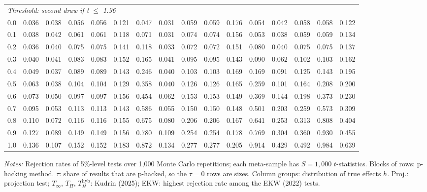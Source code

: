 \begin{table}[htbp]
\begin{tabular}{lccccccccccccccc}
\midrule
\multicolumn{16}{l}{\textit{Threshold: second draw if t $\le$ 1.96}} \\
0.0 & 0.036 & 0.038 & 0.056 & 0.056 & 0.121 & 0.047 & 0.031 & 0.059 & 0.059 & 0.176 & 0.054 & 0.042 & 0.058 & 0.058 & 0.122 \\
0.1 & 0.038 & 0.042 & 0.061 & 0.061 & 0.118 & 0.071 & 0.031 & 0.074 & 0.074 & 0.156 & 0.053 & 0.038 & 0.059 & 0.059 & 0.134 \\
0.2 & 0.036 & 0.040 & 0.075 & 0.075 & 0.141 & 0.118 & 0.033 & 0.072 & 0.072 & 0.151 & 0.080 & 0.040 & 0.075 & 0.075 & 0.137 \\
0.3 & 0.040 & 0.041 & 0.083 & 0.083 & 0.152 & 0.165 & 0.041 & 0.095 & 0.095 & 0.143 & 0.090 & 0.062 & 0.102 & 0.103 & 0.162 \\
0.4 & 0.049 & 0.037 & 0.089 & 0.089 & 0.143 & 0.246 & 0.040 & 0.103 & 0.103 & 0.169 & 0.169 & 0.091 & 0.125 & 0.143 & 0.195 \\
0.5 & 0.063 & 0.038 & 0.104 & 0.104 & 0.129 & 0.358 & 0.040 & 0.126 & 0.126 & 0.165 & 0.259 & 0.101 & 0.164 & 0.208 & 0.200 \\
0.6 & 0.073 & 0.050 & 0.097 & 0.097 & 0.156 & 0.454 & 0.062 & 0.153 & 0.153 & 0.149 & 0.369 & 0.144 & 0.198 & 0.373 & 0.230 \\
0.7 & 0.095 & 0.053 & 0.113 & 0.113 & 0.143 & 0.586 & 0.055 & 0.150 & 0.150 & 0.148 & 0.501 & 0.203 & 0.259 & 0.573 & 0.309 \\
0.8 & 0.110 & 0.072 & 0.116 & 0.116 & 0.155 & 0.675 & 0.080 & 0.206 & 0.206 & 0.167 & 0.641 & 0.253 & 0.313 & 0.808 & 0.404 \\
0.9 & 0.127 & 0.089 & 0.149 & 0.149 & 0.156 & 0.780 & 0.109 & 0.254 & 0.254 & 0.178 & 0.769 & 0.304 & 0.360 & 0.930 & 0.455 \\
1.0 & 0.136 & 0.107 & 0.152 & 0.152 & 0.183 & 0.872 & 0.134 & 0.277 & 0.277 & 0.205 & 0.914 & 0.429 & 0.492 & 0.984 & 0.639 \\
\bottomrule
\end{tabular}
\par\smallskip
\begin{minipage}{\linewidth}\footnotesize\textit{Notes:} Rejection rates of 5\%-level tests over 1,000 Monte Carlo repetitions; each meta-sample has $S = 1{,}000$ $t$-statistics. Blocks of rows: p-hacking method. $\tau$: share of results that are p-hacked, so the $\tau = 0$ rows are sizes. Column groups: distribution of true effects $h$. Proj.: projection test; $T_\infty$, $T_H$, $T_H^{\mathrm{hyb}}$: Kudrin (2025); EKW: highest rejection rate among the EKW (2022) tests.\end{minipage}
\end{table}
